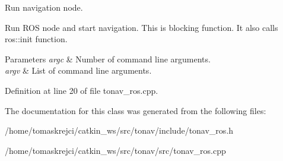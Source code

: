 Run navigation node. 

Run R\-O\-S node and start navigation. This is blocking function. It also calls {\ttfamily ros\-::init} function.


\begin{DoxyParams}{Parameters}
{\em argc} & Number of command line arguments. \\
\hline
{\em argv} & List of command line arguments. \\
\hline
\end{DoxyParams}


Definition at line 20 of file tonav\-\_\-ros.\-cpp.



The documentation for this class was generated from the following files\-:\begin{DoxyCompactItemize}
\item 
/home/tomaskrejci/catkin\-\_\-ws/src/tonav/include/tonav\-\_\-ros.\-h\item 
/home/tomaskrejci/catkin\-\_\-ws/src/tonav/src/tonav\-\_\-ros.\-cpp\end{DoxyCompactItemize}
